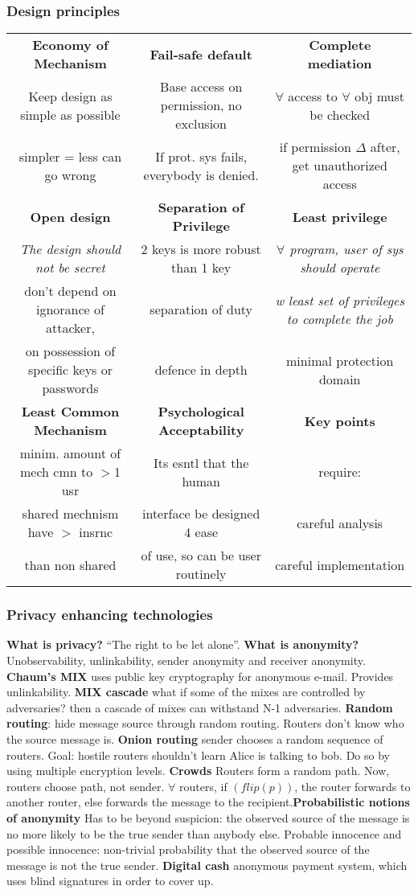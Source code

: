 \documentclass[a4paper,1pt]{article}
\begin{document}
\subsubsection{Design principles}
\begin{tabular}{| c | c | c |}
  \hline
  {\bf Economy of Mechanism} & {\bf Fail-safe default} & {\bf Complete mediation} \\
  Keep design as simple as possible & Base access on permission, no exclusion & $\forall$ access to $\forall$ obj must be checked  \\
  simpler = less can go wrong & If prot. sys fails, everybody is denied. & if permission $\Delta$ after, get unauthorized access \\
  \hline
  {\bf Open design} & {\bf Separation of Privilege} & {\bf Least privilege} \\
  \emph{The design should not be secret} & 2 keys is more robust than 1 key & \emph{$\forall$ program, user of sys should operate} \\
 don't depend on ignorance of attacker, & separation of duty  &\emph{w least set of privileges to complete the job} \\
  on possession of specific keys or passwords & defence in depth & minimal protection domain \\
  \hline
  {\bf Least Common Mechanism} & {\bf Psychological Acceptability} & {\bf Key points} \\
  minim. amount of mech cmn to $>$1 usr & Its esntl that the human  & require: \\ 
  shared mechnism have $>$ insrnc  & interface be designed 4 ease & careful analysis\\
  than non shared & of use, so can be user routinely & careful implementation \\
  \hline
\end{tabular}
\subsubsection{Privacy enhancing technologies}
{\bf What is privacy?} ``The right to be let alone''.  {\bf What is anonymity?} Unobservability, unlinkability, sender anonymity and receiver anonymity. {\bf Chaum's MIX} uses public key cryptography for anonymous e-mail. Provides unlinkability. {\bf MIX cascade} what if some of the mixes are controlled by adversaries? then a cascade of mixes can withstand N-1 adversaries. {\bf Random routing}: hide message source through random routing. Routers don't know who the source message is. {\bf Onion routing} sender chooses a random sequence of routers. Goal: hostile routers shouldn't learn Alice is talking to bob. Do so by using multiple encryption levels. {\bf Crowds} Routers form a random path. Now, routers choose path, not sender. $\forall$ routers, if $(flip(p))$, the router forwards to another router, else forwards the message to the recipient.{\bf Probabilistic notions of anonymity} Has to be beyond suspicion: the observed source of the message is no more likely to be the true sender than anybody else. Probable innocence and possible innocence: non-trivial probability that the observed source of the message is not the true sender. {\bf Digital cash} anonymous payment system, which uses blind signatures in order to cover up.
\end{document}
